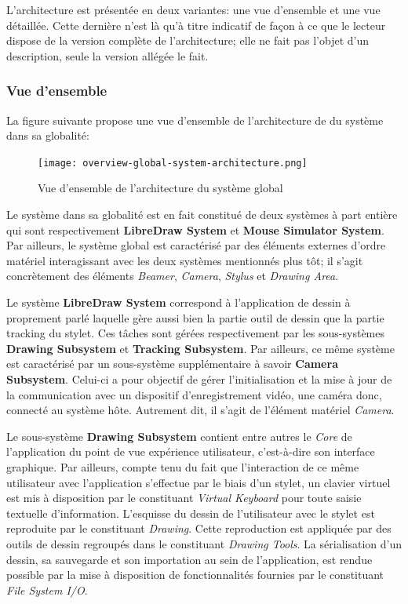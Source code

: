 \documentclass[11pt,a4paper,oldfontcommands]{memoir}
\begin{document}
L'architecture est présentée en deux variantes: une vue d'ensemble et une vue détaillée. Cette dernière n'est là qu'à titre indicatif de façon à ce que le lecteur dispose de la version complète de l'architecture; elle ne fait pas l'objet d'un description, seule la version allégée le fait.

\newpage

\subsubsection{Vue d'ensemble}

La figure suivante propose une vue d'ensemble de l'architecture de du système dans sa globalité:

\begin{figure}[H]
\centering
\texttt{[image: overview-global-system-architecture.png]}
\caption{Vue d'ensemble de l'architecture du système global}
\end{figure}

Le système dans sa globalité est en fait constitué de deux systèmes à part entière qui sont respectivement \textbf{LibreDraw System} et \textbf{Mouse Simulator System}. Par ailleurs, le système global est caractérisé par des éléments externes d'ordre matériel interagissant avec les deux systèmes mentionnés plus tôt; il s'agit concrètement des éléments \textit{Beamer}, \textit{Camera}, \textit{Stylus} et \textit{Drawing Area}.

Le système \textbf{LibreDraw System} correspond à l'application de dessin à proprement parlé laquelle gère aussi bien la partie outil de dessin que la partie tracking du stylet. Ces tâches sont gérées respectivement par les sous-systèmes \textbf{Drawing Subsystem} et \textbf{Tracking Subsystem}. Par ailleurs, ce même système est caractérisé par un sous-système supplémentaire à savoir \textbf{Camera Subsystem}. Celui-ci a pour objectif de gérer l'initialisation et la mise à jour de la communication avec un dispositif d'enregistrement vidéo, une caméra donc, connecté au système hôte. Autrement dit, il s'agit de l'élément matériel \textit{Camera}.

Le sous-système \textbf{Drawing Subsystem} contient entre autres le \textit{Core} de l'application du point de vue expérience utilisateur, c'est-à-dire son interface graphique. Par ailleurs, compte tenu du fait que l'interaction de ce même utilisateur avec l'application s'effectue par le biais d'un stylet, un clavier virtuel est mis à disposition par le constituant \textit{Virtual Keyboard} pour toute saisie textuelle d'information. L'esquisse du dessin de l'utilisateur avec le stylet est reproduite par le constituant \textit{Drawing}. Cette reproduction est appliquée par des outils de dessin regroupés dans le constituant \textit{Drawing Tools}. La sérialisation d'un dessin, sa sauvegarde et son importation au sein de l'application, est rendue possible par la mise à disposition de fonctionnalités fournies par le constituant \textit{File System I/O}.
\end{document}
